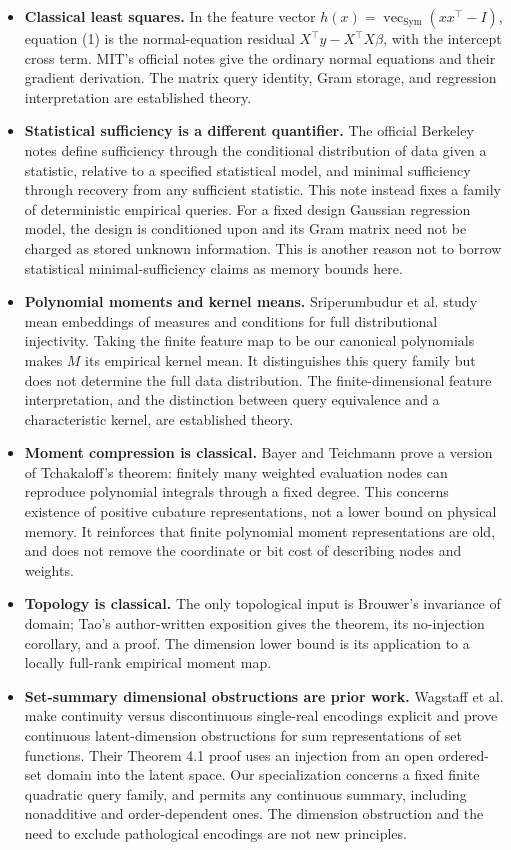 \documentclass[11pt]{article}
\newcommand{\Sym}{\operatorname{Sym}}
\begin{document}
\begin{itemize}
\item \textbf{Classical least squares.} In the feature vector
$h(x)=\operatorname{vec}_{\Sym}(xx^\top-I)$, equation (1) is the
normal-equation residual $X^\top y-X^\top X\beta$, with the intercept
cross term. MIT's official notes give the ordinary normal equations
and their gradient derivation\cite{mit}. The matrix query identity,
Gram storage, and regression interpretation are established theory.
\item \textbf{Statistical sufficiency is a different quantifier.}
The official Berkeley notes define sufficiency through the
conditional distribution of data given a statistic, relative to a
specified statistical model, and minimal sufficiency through recovery
from any sufficient statistic\cite{berkeley}. This note instead
fixes a family of deterministic empirical queries. For a fixed design
Gaussian regression model, the design is conditioned upon and its
Gram matrix need not be charged as stored unknown information. This
is another reason not to borrow statistical minimal-sufficiency
claims as memory bounds here.
\item \textbf{Polynomial moments and kernel means.}
Sriperumbudur et al. study mean embeddings of measures and conditions
for full distributional injectivity\cite{kme}. Taking the finite
feature map to be our canonical polynomials makes $M$ its empirical
kernel mean. It distinguishes this query family but does not
determine the full data distribution. The finite-dimensional feature
interpretation, and the distinction between query equivalence and
a characteristic kernel, are established theory.
\item \textbf{Moment compression is classical.}
Bayer and Teichmann prove a version of Tchakaloff's theorem: finitely
many weighted evaluation nodes can reproduce polynomial integrals
through a fixed degree\cite{tchakaloff}. This concerns existence of
positive cubature representations, not a lower bound on physical
memory. It reinforces that finite polynomial moment representations
are old, and does not remove the coordinate or bit cost of describing
nodes and weights.
\item \textbf{Topology is classical.}
The only topological input is Brouwer's invariance of domain;
Tao's author-written exposition gives the theorem, its no-injection
corollary, and a proof\cite{tao}. The dimension lower bound is its
application to a locally full-rank empirical moment map.
\item \textbf{Set-summary dimensional obstructions are prior work.}
Wagstaff et al. make continuity versus discontinuous single-real
encodings explicit and prove continuous latent-dimension obstructions
for sum representations of set functions\cite{wagstaff}. Their
Theorem 4.1 proof uses an injection from an open ordered-set domain
into the latent space. Our specialization concerns a fixed finite
quadratic query family, and permits any continuous summary, including
nonadditive and order-dependent ones. The dimension obstruction and
the need to exclude pathological encodings are not new principles.
\end{itemize}
\end{document}
